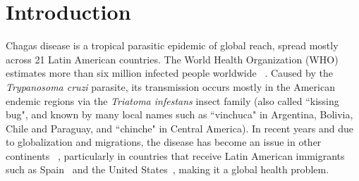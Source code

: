 
\chapter{Introduction} \label{cha:intro}


Chagas disease is a tropical parasitic epidemic of global reach, spread mostly across 21 Latin American countries. The World Health Organization (WHO) estimates more than six million infected people worldwide ~\textcite{who2016}. Caused by the \textit{Trypanosoma cruzi} parasite, its transmission occurs mostly in the American endemic regions via the \textit{Triatoma infestans} insect family (also called ``kissing bug", and known by many local names such as ``vinchuca" in Argentina, Bolivia, Chile and Paraguay, and ``chinche" in Central America). In recent years and due to globalization and migrations, the disease has become an %
issue in other continents ~\textcite{schmunis2010chagas}, 
particularly in countries that receive Latin American immigrants such as Spain~\textcite{navarro2012chagas} and the United States~\textcite{hotez2013unfolding}, 
making it a global health problem.


